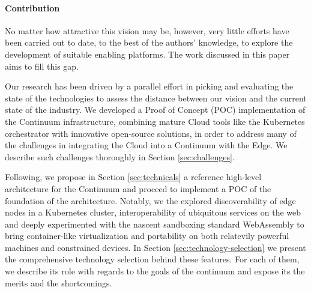 
\paragraph{Contribution}

No matter how attractive this vision may be, however, very little efforts have been carried out to date, to the best of the authors' knowledge, to explore the development of suitable enabling platforms. The work discussed in this paper aims to fill this gap. 

Our research has been driven by a parallel effort in picking and evaluating the state of the technologies to assess the distance between our vision and the current state of the industry. We developed a Proof of Concept (POC) implementation of the Continuum infrastructure, combining mature Cloud tools like the Kubernetes \cite{kubernetes} orchestrator with innovative open-source solutions, in order to address many of the challenges in integrating the Cloud into a Continuum with the Edge. We describe such challenges thoroughly in Section \ref{sec:challenges}.

Following, we propose in Section \ref{sec:technicals} a reference high-level architecture for the Continuum and proceed to implement a POC of the foundation of the architecture. Notably, we the explored discoverability of edge nodes in a Kubernetes cluster, interoperability of ubiquitous services on the web and deeply experimented with the nascent sandboxing standard WebAssembly \cite{haas2017bringing} to bring container-like virtualization and portability on both relatevily powerful machines and constrained devices. In Section \ref{sec:technology-selection} we present the comprehensive technology selection behind these features. For each of them, we describe its role with regards to the goals of the continuum and expose its the merits and the shortcomings. 

